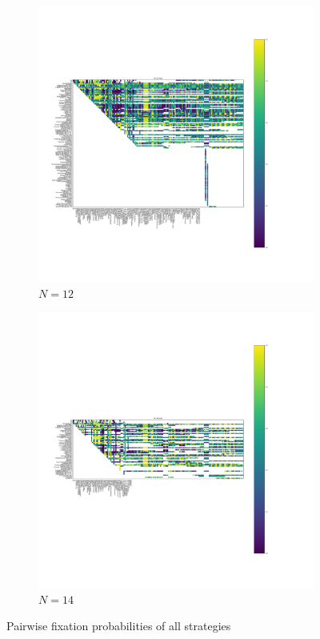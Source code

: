 \documentclass{article}
\begin{document}
\begin{figure}[!hbtp]
\begin{subfigure}[t]{.3\textwidth}
        \centering
        \includegraphics[width=.8\textwidth]{../img/fixation_heatmap_12_std.pdf}
        \caption{\(N=12\)}
    \end{subfigure}%

    \begin{subfigure}[t]{.3\textwidth}
        \centering
        \includegraphics[width=.8\textwidth]{../img/fixation_heatmap_14_std.pdf}
        \caption{\(N=14\)}
    \end{subfigure}%
    \caption{Pairwise fixation probabilities of all strategies}
    \label{fig:fixation_heatmap_std}
\end{figure}
\end{document}

